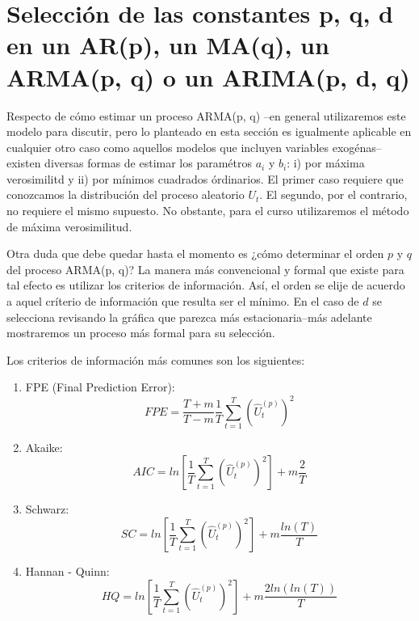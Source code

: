 \documentclass[
]{book}
\begin{document}
\hypertarget{selecciuxf3n-de-las-constantes-p-q-d-en-un-arp-un-maq-un-armap-q-o-un-arimap-d-q}{%
\section{Selección de las constantes p, q, d en un AR(p), un MA(q), un ARMA(p, q) o un ARIMA(p, d, q)}\label{selecciuxf3n-de-las-constantes-p-q-d-en-un-arp-un-maq-un-armap-q-o-un-arimap-d-q}}

Respecto de cómo estimar un proceso ARMA(p, q) --en general utilizaremos este modelo para discutir, pero lo planteado en esta sección es igualmente aplicable en cualquier otro caso como aquellos modelos que incluyen variables exogénas-- existen diversas formas de estimar los paramétros \(a_i\) y \(b_i\): i) por máxima verosimilitd y ii) por mínimos cuadrados órdinarios. El primer caso requiere que conozcamos la distribución del proceso aleatorio \(U_t\). El segundo, por el contrario, no requiere el mismo supuesto. No obstante, para el curso utilizaremos el método de máxima verosimilitud.

Otra duda que debe quedar hasta el momento es ¿cómo determinar el orden \(p\) y \(q\) del proceso ARMA(p, q)? La manera más convencional y formal que existe para tal efecto es utilizar los criterios de información. Así, el orden se elije de acuerdo a aquel críterio de información que resulta ser el mínimo. En el caso de \(d\) se selecciona revisando la gráfica que parezca más estacionaria--más adelante mostraremos un proceso más formal para su selección.

Los criterios de información más comunes son los siguientes:

\begin{enumerate}
\def\labelenumi{\arabic{enumi}.}
\item
  FPE (Final Prediction Error):
  \begin{equation}
   FPE = \frac{T+m}{T-m}\frac{1}{T}\sum_{t=1}^{T} \left( \hat{U}_t^{(p)} \right) ^2
  \end{equation}
\item
  Akaike:
  \begin{equation}
   AIC = ln \left[ \frac{1}{T} \sum_{t=1}^{T} \left( \hat{U}_t^{(p)} \right) ^2 \right] + m \frac{2}{T}
  \end{equation}
\item
  Schwarz:
  \begin{equation}
   SC = ln \left[ \frac{1}{T} \sum_{t=1}^{T} \left( \hat{U}_t^{(p)} \right) ^2 \right] + m \frac{ln(T)}{T}
  \end{equation}
\item
  Hannan - Quinn:
  \begin{equation}
   HQ = ln \left[ \frac{1}{T} \sum_{t=1}^{T} \left( \hat{U}_t^{(p)} \right) ^2 \right] + m \frac{2 ln(ln(T))}{T}
  \end{equation}
\end{enumerate}
\end{document}
